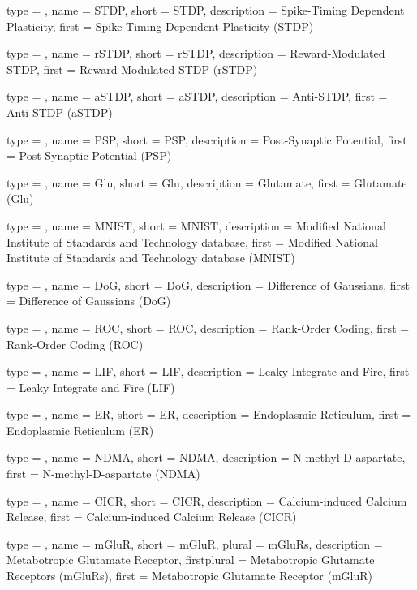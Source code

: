 {
	type        = \acronymtype,
	name        = {STDP},
	short       = {STDP},
	description = {Spike-Timing Dependent Plasticity},
	first       = {Spike-Timing Dependent Plasticity (STDP)}
}

{
	type        = \acronymtype,
	name        = {rSTDP},
	short       = {rSTDP},
	description = {Reward-Modulated STDP},
	first       = {Reward-Modulated STDP (rSTDP)}
}

{
	type        = \acronymtype,
	name        = {aSTDP},
	short       = {aSTDP},
	description = {Anti-STDP},
	first       = {Anti-STDP (aSTDP)}
}

{
	type        = \acronymtype,
	name        = {PSP},
	short       = {PSP},
	description = {Post-Synaptic Potential},
	first       = {Post-Synaptic Potential (PSP)}
}

{
	type        = \acronymtype,
	name        = {Glu},
	short       = {Glu},
	description = {Glutamate},
	first       = {Glutamate (Glu)}
}

{
	type        = \acronymtype,
	name        = {MNIST},
	short       = {MNIST},
	description = {Modified National Institute of Standards and Technology database},
	first       = {Modified National Institute of Standards and Technology database (MNIST)}
}

{
	type        = \acronymtype,
	name        = {DoG},
	short       = {DoG},
	description = {Difference of Gaussians},
	first       = {Difference of Gaussians (DoG)}
}

{
	type        = \acronymtype,
	name        = {ROC},
	short       = {ROC},
	description = {Rank-Order Coding},
	first       = {Rank-Order Coding (ROC)}
}

{
	type        = \acronymtype,
	name        = {LIF},
	short       = {LIF},
	description = {Leaky Integrate and Fire},
	first       = {Leaky Integrate and Fire (LIF)}
}

{
	type        = \acronymtype,
	name        = {ER},
	short       = {ER},
	description = {Endoplasmic Reticulum},
	first       = {Endoplasmic Reticulum (ER)}
}

{
	type        = \acronymtype,
	name        = {NDMA},
	short       = {NDMA},
	description = {N-methyl-D-aspartate},
	first       = {N-methyl-D-aspartate (NDMA)}
}

{
	type        = \acronymtype,
	name        = {CICR},
	short       = {CICR},
	description = {Calcium-induced Calcium Release},
	first       = {Calcium-induced Calcium Release (CICR)}
}

{
	type        = \acronymtype,
	name        = {mGluR},
	short       = {mGluR},
    plural      = {mGluRs},
	description = {Metabotropic Glutamate Receptor},
	firstplural = {Metabotropic Glutamate Receptors (mGluRs)},
	first       = {Metabotropic Glutamate Receptor (mGluR)}
}
